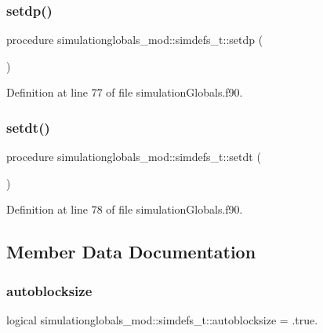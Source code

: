 \subsubsection{\texorpdfstring{setdp()}{setdp()}}
{\footnotesize\ttfamily procedure simulationglobals\+\_\+mod\+::simdefs\+\_\+t\+::setdp (\begin{DoxyParamCaption}{ }\end{DoxyParamCaption})\hspace{0.3cm}{\ttfamily [private]}}



Definition at line 77 of file simulation\+Globals.\+f90.

\mbox{\label{structsimulationglobals__mod_1_1simdefs__t_ab31ff2c6186712023df66976f48ee3e7}} 
\subsubsection{\texorpdfstring{setdt()}{setdt()}}
{\footnotesize\ttfamily procedure simulationglobals\+\_\+mod\+::simdefs\+\_\+t\+::setdt (\begin{DoxyParamCaption}{ }\end{DoxyParamCaption})\hspace{0.3cm}{\ttfamily [private]}}



Definition at line 78 of file simulation\+Globals.\+f90.



\subsection{Member Data Documentation}
\mbox{\label{structsimulationglobals__mod_1_1simdefs__t_afe52beb1868355418e312ffb9ef8f0ad}} 
\subsubsection{\texorpdfstring{autoblocksize}{autoblocksize}}
{\footnotesize\ttfamily logical simulationglobals\+\_\+mod\+::simdefs\+\_\+t\+::autoblocksize = .true.\hspace{0.3cm}{\ttfamily [private]}}



